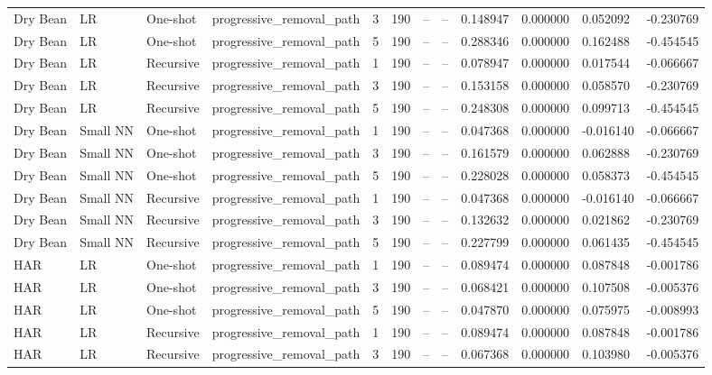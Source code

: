 \begin{table}[t]
\begin{tabular}{llllllllllll}
Dry Bean & LR & One-shot & progressive\_removal\_path & 3 & 190 & -- & -- & 0.148947 & 0.000000 & 0.052092 & -0.230769 \\
Dry Bean & LR & One-shot & progressive\_removal\_path & 5 & 190 & -- & -- & 0.288346 & 0.000000 & 0.162488 & -0.454545 \\
Dry Bean & LR & Recursive & progressive\_removal\_path & 1 & 190 & -- & -- & 0.078947 & 0.000000 & 0.017544 & -0.066667 \\
Dry Bean & LR & Recursive & progressive\_removal\_path & 3 & 190 & -- & -- & 0.153158 & 0.000000 & 0.058570 & -0.230769 \\
Dry Bean & LR & Recursive & progressive\_removal\_path & 5 & 190 & -- & -- & 0.248308 & 0.000000 & 0.099713 & -0.454545 \\
Dry Bean & Small NN & One-shot & progressive\_removal\_path & 1 & 190 & -- & -- & 0.047368 & 0.000000 & -0.016140 & -0.066667 \\
Dry Bean & Small NN & One-shot & progressive\_removal\_path & 3 & 190 & -- & -- & 0.161579 & 0.000000 & 0.062888 & -0.230769 \\
Dry Bean & Small NN & One-shot & progressive\_removal\_path & 5 & 190 & -- & -- & 0.228028 & 0.000000 & 0.058373 & -0.454545 \\
Dry Bean & Small NN & Recursive & progressive\_removal\_path & 1 & 190 & -- & -- & 0.047368 & 0.000000 & -0.016140 & -0.066667 \\
Dry Bean & Small NN & Recursive & progressive\_removal\_path & 3 & 190 & -- & -- & 0.132632 & 0.000000 & 0.021862 & -0.230769 \\
Dry Bean & Small NN & Recursive & progressive\_removal\_path & 5 & 190 & -- & -- & 0.227799 & 0.000000 & 0.061435 & -0.454545 \\
HAR & LR & One-shot & progressive\_removal\_path & 1 & 190 & -- & -- & 0.089474 & 0.000000 & 0.087848 & -0.001786 \\
HAR & LR & One-shot & progressive\_removal\_path & 3 & 190 & -- & -- & 0.068421 & 0.000000 & 0.107508 & -0.005376 \\
HAR & LR & One-shot & progressive\_removal\_path & 5 & 190 & -- & -- & 0.047870 & 0.000000 & 0.075975 & -0.008993 \\
HAR & LR & Recursive & progressive\_removal\_path & 1 & 190 & -- & -- & 0.089474 & 0.000000 & 0.087848 & -0.001786 \\
HAR & LR & Recursive & progressive\_removal\_path & 3 & 190 & -- & -- & 0.067368 & 0.000000 & 0.103980 & -0.005376 \\

\end{tabular}
\end{table}
